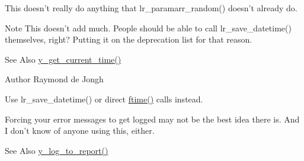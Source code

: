 
\begin{DoxyRefList}
\item[\label{deprecated__deprecated000014}%
\hypertarget{deprecated__deprecated000014}{}%
Member \hyperlink{y__param__array_8c_afb0cc8ca2f0a0f64b015d2becd2cbe39}{y\-\_\-array\-\_\-get\-\_\-random} (const char $\ast$source\-\_\-param\-\_\-array)]This doesn't really do anything that lr\-\_\-paramarr\-\_\-random() doesn't already do. 
\item[\label{deprecated__deprecated000007}%
\hypertarget{deprecated__deprecated000007}{}%
Member \hyperlink{group__loadrunner__utils_ga7841e4b695b3dbae20f9d9276eecc07a}{y\-\_\-datetime} ()]\begin{DoxyNote}{Note}
This doesn't add much. People should be able to call lr\-\_\-save\-\_\-datetime() themselves, right? Putting it on the deprecation list for that reason. 
 
\end{DoxyNote}
\begin{DoxySeeAlso}{See Also}
\hyperlink{group__loadrunner__utils_ga17b08587d9d4bead3865b4778bda878b}{y\-\_\-get\-\_\-current\-\_\-time()} 
\end{DoxySeeAlso}
\begin{DoxyAuthor}{Author}
Raymond de Jongh  
\end{DoxyAuthor}

\item[\label{deprecated__deprecated000009}%
\hypertarget{deprecated__deprecated000009}{}%
Member \hyperlink{y__logging_8c_a9b402b9377251d1b78db7507c76fd886}{y\-\_\-get\-\_\-datetimestamp} ()]Use lr\-\_\-save\-\_\-datetime() or direct \hyperlink{group__time_gafc0d3a1676a915f3cedcad79759f6802}{ftime()} calls instead. 
\item[\label{deprecated__deprecated000012}%
\hypertarget{deprecated__deprecated000012}{}%
Member \hyperlink{y__logging_8c_a9699f5d59ff8a52ff94352d41b033ea5}{y\-\_\-log\-\_\-error} (char $\ast$message)]Forcing your error messages to get logged may not be the best idea there is. And I don't know of anyone using this, either. \begin{DoxySeeAlso}{See Also}
\hyperlink{y__logging_8c_a440898bcda285688344b7147e26ff5b7}{y\-\_\-log\-\_\-to\-\_\-report()}  
\end{DoxySeeAlso}


\end{DoxyRefList}
